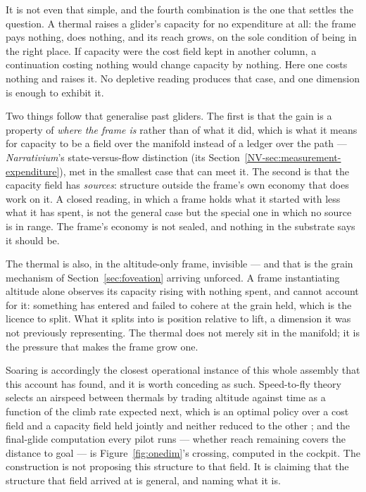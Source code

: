 \documentclass[11pt,a4paper]{article}
\theoremstyle{remark}
\begin{document}
It is not even that simple, and the fourth combination is the one that settles the question. A
thermal raises a glider's capacity for no expenditure at all: the frame pays nothing, does nothing,
and its reach grows, on the sole condition of being in the right place. If capacity were the cost
field kept in another column, a continuation costing nothing would change capacity by nothing. Here
one costs nothing and raises it. No depletive reading produces that case, and one dimension is enough
to exhibit it.

Two things follow that generalise past gliders. The first is that the gain is a property of
\emph{where the frame is} rather than of what it did, which is what it means for capacity to be a
field over the manifold instead of a ledger over the path --- \emph{Narrativium}'s state-versus-flow
distinction (its Section~\ref{NV-sec:measurement-expenditure}), met in the smallest case that can meet
it. The second is that the capacity field has
\emph{sources}: structure outside the frame's own economy that does work on it. A closed reading, in
which a frame holds what it started with less what it has spent, is not the general case but the
special one in which no source is in range. The frame's economy is not sealed, and nothing in the
substrate says it should be.

The thermal is also, in the altitude-only frame, invisible --- and that is the grain mechanism of
Section~\ref{sec:foveation} arriving unforced. A frame instantiating altitude alone observes its
capacity rising with nothing spent, and cannot account for it: something has entered and failed to
cohere at the grain held, which is the licence to split. What it splits into is position relative to
lift, a dimension it was not previously representing. The thermal does not merely sit in the
manifold; it is the pressure that makes the frame grow one.

Soaring is accordingly the closest operational instance of this whole assembly that this account has
found, and it is worth conceding as such. Speed-to-fly theory selects an airspeed between thermals
by trading altitude against time as a function of the climb rate expected next, which is an optimal
policy over a cost field and a capacity field held jointly and neither reduced to the other
\citep{maccready1958,reichmann1978}; and the final-glide computation every pilot runs --- whether
reach remaining covers the distance to goal --- is Figure~\ref{fig:onedim}'s crossing, computed in
the cockpit. The construction is not proposing this structure to that field. It is claiming that the
structure that field arrived at is general, and naming what it is.
\end{document}

